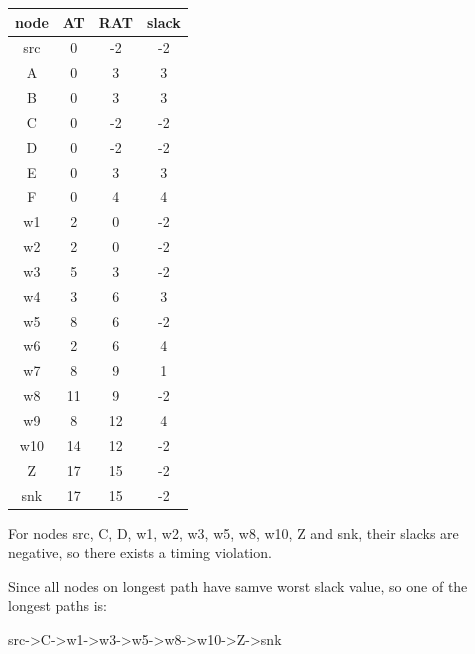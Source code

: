 \documentclass[12pt]{article}
\begin{document}
    \begin{center}
    \begin{tabular}{|c|c|c|c|}
        \hline
        node & AT & RAT & slack \\
        \hline
        src & 0 & -2 & -2 \\
        \hline
        A & 0 & 3 & 3 \\
        \hline
        B & 0 & 3 & 3 \\
        \hline
        C & 0 & -2 & -2 \\
        \hline
        D & 0 & -2 & -2 \\
        \hline
        E & 0 & 3 & 3 \\
        \hline
        F & 0 & 4 & 4 \\
        \hline
        w1 & 2 & 0 & -2 \\
        \hline
        w2 & 2 & 0 & -2 \\
        \hline
        w3 & 5 & 3 & -2 \\
        \hline
        w4 & 3 & 6 & 3 \\
        \hline
        w5 & 8 & 6 & -2 \\
        \hline
        w6 & 2 & 6 & 4 \\
        \hline
        w7 & 8 & 9 & 1 \\
        \hline
        w8 & 11 & 9 & -2 \\
        \hline
        w9 & 8 & 12 & 4 \\
        \hline
        w10 & 14 & 12 & -2 \\
        \hline
        Z & 17 & 15 & -2 \\
        \hline
        snk & 17 & 15 & -2 \\
        \hline
    \end{tabular}
    \end{center}

    For nodes src, C, D, w1, w2, w3, w5, w8, w10, Z and snk, their slacks are negative,
    so there exists a timing violation.

    Since all nodes on longest path have samve worst slack value, so one of the longest
    paths is:

    src->C->w1->w3->w5->w8->w10->Z->snk
\end{document}
